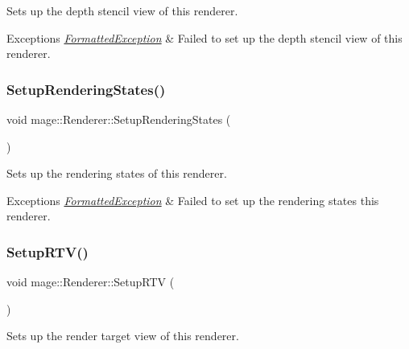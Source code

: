 Sets up the depth stencil view of this renderer.


\begin{DoxyExceptions}{Exceptions}
{\em \hyperlink{structmage_1_1_formatted_exception}{Formatted\+Exception}} & Failed to set up the depth stencil view of this renderer. \\
\hline
\end{DoxyExceptions}
\hypertarget{classmage_1_1_renderer_ae69efac8c058f25f1c5d409c4ec7ff6e}{}\label{classmage_1_1_renderer_ae69efac8c058f25f1c5d409c4ec7ff6e} 
\subsubsection{\texorpdfstring{Setup\+Rendering\+States()}{SetupRenderingStates()}}
{\footnotesize\ttfamily void mage\+::\+Renderer\+::\+Setup\+Rendering\+States (\begin{DoxyParamCaption}{ }\end{DoxyParamCaption})\hspace{0.3cm}{\ttfamily [private]}}

Sets up the rendering states of this renderer.


\begin{DoxyExceptions}{Exceptions}
{\em \hyperlink{structmage_1_1_formatted_exception}{Formatted\+Exception}} & Failed to set up the rendering states this renderer. \\
\hline
\end{DoxyExceptions}
\hypertarget{classmage_1_1_renderer_a80f3191e8c8932f8828bca4e5086c0c0}{}\label{classmage_1_1_renderer_a80f3191e8c8932f8828bca4e5086c0c0} 
\subsubsection{\texorpdfstring{Setup\+R\+T\+V()}{SetupRTV()}}
{\footnotesize\ttfamily void mage\+::\+Renderer\+::\+Setup\+R\+TV (\begin{DoxyParamCaption}{ }\end{DoxyParamCaption})\hspace{0.3cm}{\ttfamily [private]}}

Sets up the render target view of this renderer.


